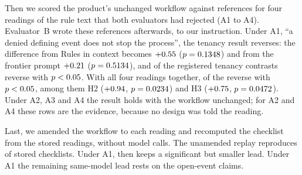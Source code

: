 Then we scored the product's unchanged workflow against references for four readings of the rule text that both evaluators had rejected (A1 to A4). Evaluator~B wrote these references afterwards, to our instruction. Under A1, ``a denied defining event does not stop the process'', the tenancy result reverses: the difference from Rules in context becomes $+0.55$ ($p=0.1348$) and from the frontier prompt $+0.21$ ($p=0.5134$), and \sthreeFFiveAOneReverseSig{} of the \sthreeFFiveAOneContrasts{} registered tenancy contrasts reverse with $p<0.05$. With all four readings together, \sthreeFFiveAAllReverseSig{} of the \sthreeFFiveAAllContrasts{} reverse with $p<0.05$, among them H2 ($+0.94$, $p=0.0234$) and H3 ($+0.75$, $p=0.0472$). Under A2, A3 and A4 the result holds with the workflow unchanged; for A2 and A4 these rows are the evidence, because no design was told the reading.

Last, we amended the workflow to each reading and recomputed the checklist from the stored readings, without model calls. The unamended replay reproduces \sthreeFFiveBReproducesCasePath{} of \sthreeFFiveBReplayedCasePath{} stored checklists. Under A1, \casepath then keeps a significant but smaller lead. Under A1 the remaining same-model lead rests on the \sthreeClaimsOpenEvent{} open-event claims.

